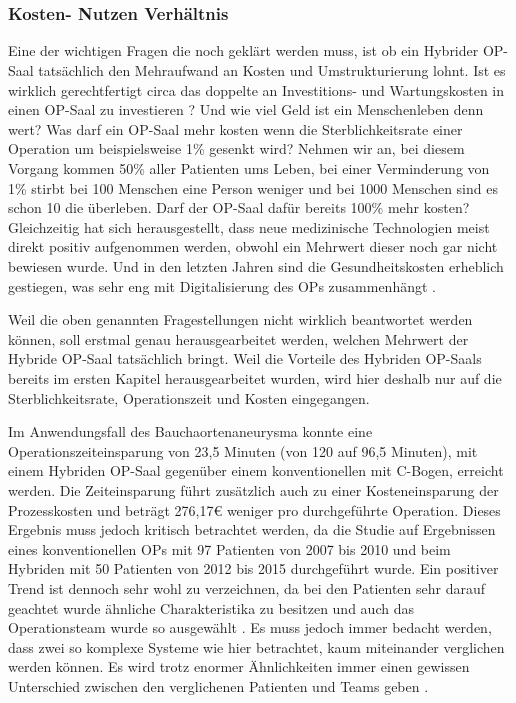 \chapter{}
\label{sec:overview}

\subsection{Kosten- Nutzen Verhältnis}

Eine der wichtigen Fragen die noch geklärt werden muss, ist ob ein Hybrider OP-Saal tatsächlich den Mehraufwand an Kosten und Umstrukturierung lohnt. 
Ist es wirklich gerechtfertigt circa das doppelte an Investitions- und Wartungskosten in einen OP-Saal zu investieren \cite{ORofTheFuture}? Und wie viel Geld ist ein Menschenleben denn wert? Was darf ein OP-Saal mehr kosten wenn die Sterblichkeitsrate einer Operation um beispielsweise 1\% gesenkt wird? Nehmen wir an, bei diesem Vorgang kommen 50\% aller Patienten ums Leben, bei einer Verminderung von 1\% stirbt bei 100 Menschen eine Person weniger und bei 1000 Menschen sind es schon 10 die überleben. Darf der OP-Saal dafür bereits 100\% mehr kosten?
Gleichzeitig hat sich herausgestellt, dass neue medizinische Technologien meist direkt positiv aufgenommen werden, obwohl ein Mehrwert dieser noch gar nicht bewiesen wurde. Und in den letzten Jahren sind die Gesundheitskosten erheblich gestiegen, was sehr eng mit Digitalisierung des OPs zusammenhängt \cite{DerDigitaleOperationssaal}.

Weil die oben genannten Fragestellungen nicht wirklich beantwortet werden können, soll erstmal genau herausgearbeitet werden, welchen Mehrwert der Hybride OP-Saal tatsächlich bringt. Weil die Vorteile des Hybriden OP-Saals bereits im ersten Kapitel herausgearbeitet wurden, wird hier deshalb nur auf die Sterblichkeitsrate, Operationszeit und Kosten eingegangen.



Im Anwendungsfall des Bauchaortenaneurysma konnte eine Operationszeiteinsparung von 23,5 Minuten (von 120 auf 96,5 Minuten), mit einem Hybriden OP-Saal gegenüber einem konventionellen mit C-Bogen, erreicht werden. Die Zeiteinsparung führt zusätzlich auch zu einer Kosteneinsparung der Prozesskosten und beträgt 276,17€ weniger pro durchgeführte Operation.
Dieses Ergebnis muss jedoch kritisch betrachtet werden, da die Studie auf Ergebnissen eines konventionellen OPs mit 97 Patienten von 2007 bis 2010 und beim Hybriden mit 50 Patienten von 2012 bis 2015 durchgeführt wurde. Ein positiver Trend ist dennoch sehr wohl zu verzeichnen, da bei den Patienten sehr darauf geachtet wurde ähnliche Charakteristika zu besitzen und auch das Operationsteam wurde so ausgewählt \cite{HybriderVsKonventioneller}.
Es muss jedoch immer bedacht werden, dass zwei so komplexe Systeme wie hier betrachtet, kaum miteinander verglichen werden können. Es wird trotz enormer Ähnlichkeiten immer einen gewissen Unterschied zwischen den verglichenen Patienten und Teams geben \cite{DerDigitaleOperationssaal}.

